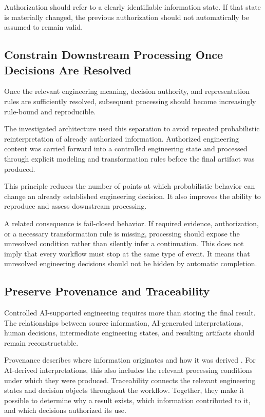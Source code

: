 Authorization should refer to a clearly identifiable information state. If that state is
materially changed, the previous authorization should not automatically be assumed to remain
valid.

\subsection{Constrain Downstream Processing Once Decisions Are Resolved}
\label{sec:principle_constraints}

Once the relevant engineering meaning, decision authority, and representation rules are
sufficiently resolved, subsequent processing should become increasingly rule-bound and
reproducible.

The investigated architecture used this separation to avoid repeated probabilistic
reinterpretation of already authorized information. Authorized engineering content was
carried forward into a controlled engineering state and processed through explicit modeling
and transformation rules before the final artifact was produced.

This principle reduces the number of points at which probabilistic behavior can change an
already established engineering decision. It also improves the ability to reproduce and
assess downstream processing.

A related consequence is fail-closed behavior. If required evidence, authorization, or a
necessary transformation rule is missing, processing should expose the unresolved condition
rather than silently infer a continuation. This does not imply that every workflow must stop
at the same type of event. It means that unresolved engineering decisions should not be
hidden by automatic completion.

\subsection{Preserve Provenance and Traceability}
\label{sec:principle_traceability}

Controlled AI-supported engineering requires more than storing the final result. The
relationships between source information, AI-generated interpretations, human decisions,
intermediate engineering states, and resulting artifacts should remain reconstructable.

Provenance describes where information originates and how it was derived
\cite{MoreauMissier2013,Simmhan2005}. For AI-derived interpretations, this also includes
the relevant processing conditions under which they were produced. Traceability connects
the relevant engineering states and decision objects throughout the workflow. Together, they make it possible to determine
why a result exists, which information contributed to it, and which decisions authorized its
use.


